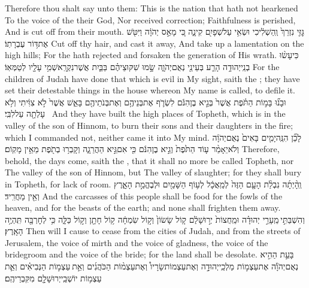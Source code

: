 {Therefore thou shalt say unto them: This is the nation that hath not hearkened To the voice of the \lord\space their God, Nor received correction; Faithfulness is perished, And is cut off from their mouth.}
{גׇּזִּ֤י נִזְרֵךְ֙ וְֽהַשְׁלִ֔יכִי וּשְׂאִ֥י עַל\maqqaf שְׁפָיִ֖ם קִינָ֑ה כִּ֚י מָאַ֣ס יְהֹוָ֔ה וַיִּטֹּ֖שׁ אֶת\maqqaf דּ֥וֹר עֶבְרָתֽוֹ׃}
{Cut off thy hair, and cast it away, And take up a lamentation on the high hills; For the \lord\space hath rejected and forsaken the generation of His wrath.}
{כִּי\maqqaf עָשׂ֨וּ בְנֵֽי\maqqaf יְהוּדָ֥ה הָרַ֛ע בְּעֵינַ֖י נְאֻם\maqqaf יְהֹוָ֑ה שָׂ֣מוּ שִׁקּוּצֵיהֶ֗ם בַּבַּ֛יִת אֲשֶׁר\maqqaf נִקְרָֽא\maqqaf שְׁמִ֥י עָלָ֖יו לְטַמְּאֽוֹ׃}
{For the children of Judah have done that which is evil in My sight, saith the \lord; they have set their detestable things in the house whereon My name is called, to defile it.}
{וּבָנ֞וּ בָּמ֣וֹת הַתֹּ֗פֶת אֲשֶׁר֙ בְּגֵ֣יא בֶן\maqqaf הִנֹּ֔ם לִשְׂרֹ֛ף אֶת\maqqaf בְּנֵיהֶ֥ם וְאֶת\maqqaf בְּנֹתֵיהֶ֖ם בָּאֵ֑שׁ אֲשֶׁר֙ לֹ֣א צִוִּ֔יתִי וְלֹ֥א עָלְתָ֖ה עַל\maqqaf לִבִּֽי׃ \petucha }
{And they have built the high places of Topheth, which is in the valley of the son of Hinnom, to burn their sons and their daughters in the fire; which I commanded not, neither came it into My mind.}
{לָכֵ֞ן הִנֵּֽה\maqqaf יָמִ֤ים בָּאִים֙ נְאֻם\maqqaf יְהֹוָ֔ה וְלֹא\maqqaf יֵאָמֵ֨ר ע֤וֹד הַתֹּ֙פֶת֙ וְגֵ֣יא בֶן\maqqaf הִנֹּ֔ם כִּ֖י אִם\maqqaf גֵּ֣יא הַהֲרֵגָ֑ה וְקָבְר֥וּ בְתֹ֖פֶת מֵאֵ֥ין מָקֽוֹם׃}
{Therefore, behold, the days come, saith the \lord, that it shall no more be called Topheth, nor The valley of the son of Hinnom, but The valley of slaughter; for they shall bury in Topheth, for lack of room.}
{וְֽהָ֨יְתָ֜ה נִבְלַ֨ת הָעָ֤ם הַזֶּה֙ לְמַֽאֲכָ֔ל לְע֥וֹף הַשָּׁמַ֖יִם וּלְבֶהֱמַ֣ת הָאָ֑רֶץ וְאֵ֖ין מַחֲרִֽיד׃}
{And the carcasses of this people shall be food for the fowls of the heaven, and for the beasts of the earth; and none shall frighten them away.}
{וְהִשְׁבַּתִּ֣י \legarmeh  מֵֽעָרֵ֣י יְהוּדָ֗ה וּמֵֽחֻצוֹת֙ יְר֣וּשָׁלַ֔͏ִם ק֤וֹל שָׂשׂוֹן֙ וְק֣וֹל שִׂמְחָ֔ה ק֥וֹל חָתָ֖ן וְק֣וֹל כַּלָּ֑ה כִּ֥י לְחׇרְבָּ֖ה תִּֽהְיֶ֥ה הָאָֽרֶץ׃}
{Then will I cause to cease from the cities of Judah, and from the streets of Jerusalem, the voice of mirth and the voice of gladness, the voice of the bridegroom and the voice of the bride; for the land shall be desolate.}
\newperek
{}
{בָּעֵ֣ת הַהִ֣יא נְאֻם\maqqaf יְהֹוָ֡ה  אֶת\maqqaf עַצְמ֣וֹת מַלְכֵֽי\maqqaf יְהוּדָ֣ה וְאֶת\maqqaf עַצְמוֹת\maqqaf שָׂרָיו֩ וְאֶת\maqqaf עַצְמ֨וֹת הַכֹּהֲנִ֜ים וְאֵ֣ת \legarmeh  עַצְמ֣וֹת הַנְּבִיאִ֗ים וְאֵ֛ת עַצְמ֥וֹת יוֹשְׁבֵֽי\maqqaf יְרוּשָׁלָ֖͏ִם מִקִּבְרֵיהֶֽם׃}
